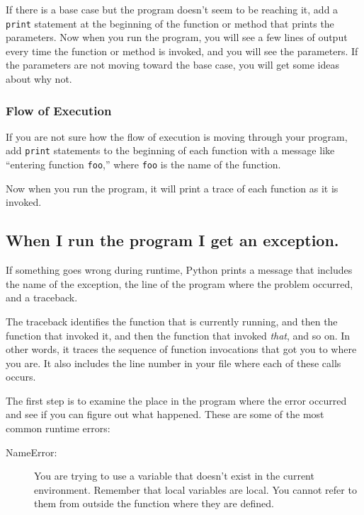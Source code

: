 \documentclass[10pt]{book}
\begin{document}
\begin{CJK}{UTF8}{gbsn}
If there is a base case but the program doesn't seem to be reaching
it, add a {\tt print} statement at the beginning of the function or method
that prints the parameters.  Now when you run the program, you will see
a few lines of output every time the function or method is invoked,
and you will see the parameters.  If the parameters are not moving
toward the base case, you will get some ideas about why not.


\subsubsection{Flow of Execution}

If you are not sure how the flow of execution is moving through
your program, add {\tt print} statements to the beginning of each
function with a message like ``entering function {\tt foo},'' where
{\tt foo} is the name of the function.

Now when you run the program, it will print a trace of each
function as it is invoked.


\subsection{When I run the program I get an exception.}

If something goes wrong during runtime, Python
prints a message that includes the name of the
exception, the line of the program where the problem occurred,
and a traceback.

The traceback identifies the function that is currently running,
and then the function that invoked it, and then the function that
invoked {\em that}, and so on.  In other words, it traces the
sequence of function invocations that got you to where you are.  It
also includes the line number in your file where each of these
calls occurs.

The first step is to examine the place in the program where
the error occurred and see if you can figure out what happened.
These are some of the most common runtime errors:

\begin{description}

\item[NameError:]  You are trying to use a variable that doesn't
exist in the current environment.
Remember that local variables are local.  You
cannot refer to them from outside the function where they are defined.


\end{description}
\end{CJK}
\end{document}
